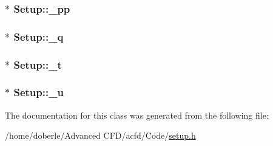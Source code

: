 \subsubsection[{\texorpdfstring{\+\_\+pp}{_pp}}]{$\ast$ Setup\+::\+\_\+pp\hspace{0.3cm}{\ttfamily [protected]}}\hypertarget{class_setup_adc487395b8e8221d9b8f0ba0b29d2540}{}\label{class_setup_adc487395b8e8221d9b8f0ba0b29d2540}
\subsubsection[{\texorpdfstring{\+\_\+q}{_q}}]{$\ast$ Setup\+::\+\_\+q\hspace{0.3cm}{\ttfamily [protected]}}\hypertarget{class_setup_a0b2e5fd96ef68ea898700ead61d27973}{}\label{class_setup_a0b2e5fd96ef68ea898700ead61d27973}
\subsubsection[{\texorpdfstring{\+\_\+t}{_t}}]{$\ast$ Setup\+::\+\_\+t\hspace{0.3cm}{\ttfamily [protected]}}\hypertarget{class_setup_acbbdb0a7312ce4dd45a64a200d780c3d}{}\label{class_setup_acbbdb0a7312ce4dd45a64a200d780c3d}
\subsubsection[{\texorpdfstring{\+\_\+u}{_u}}]{$\ast$ Setup\+::\+\_\+u\hspace{0.3cm}{\ttfamily [protected]}}\hypertarget{class_setup_a873ce4c87704142ce98b6cc0dfd779e7}{}\label{class_setup_a873ce4c87704142ce98b6cc0dfd779e7}


The documentation for this class was generated from the following file\+:\begin{DoxyCompactItemize}
\item 
/home/doberle/\+Advanced C\+F\+D/acfd/\+Code/\hyperlink{setup_8h}{setup.\+h}\end{DoxyCompactItemize}
